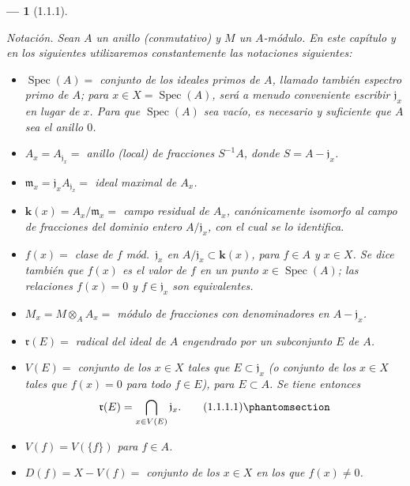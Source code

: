 \documentclass[oneside]{amsart}
\theoremstyle{ega-env-style}
\newtheorem*{env}{---}
\theoremstyle{ega-thm-env-style}
\theoremstyle{ega-defn-env-style}
\newcommand{\oldpage}[2][]{{\marginnote{\normalfont{\textbf{#1}~|~#2}}}\ignorespaces}
\let\EGAOriginalLabel\label
\renewcommand{\label}[1]{\phantomsection\EGAOriginalLabel{#1}}
\begin{document}
\oldpage[I]{80}
\begin{env}[1.1.1]
\label{I.1.1.1}

\emph{Notación}. Sean $A$ un anillo (conmutativo) y $M$ un $A$-módulo.
En este capítulo y en los siguientes utilizaremos constantemente las notaciones siguientes:
\begin{itemize}
  \item $\operatorname{Spec}(A)={}$ \emph{conjunto de los ideales primos} de $A$, llamado también \emph{espectro primo} de $A$; para $x\in X=\operatorname{Spec}(A)$, será a menudo conveniente escribir $\mathfrak{j}_x$ en lugar de $x$.
    Para que $\operatorname{Spec}(A)$ sea \emph{vacío}, es necesario y suficiente que $A$ sea el anillo $0$.
  \item $A_x=A_{\mathfrak{j}_x}={}$ \emph{anillo (local) de fracciones $S^{-1}A$}, donde $S=A-\mathfrak{j}_x$.
  \item $\mathfrak{m}_x=\mathfrak{j}_xA_{\mathfrak{j}_x}={}$ \emph{ideal maximal de $A_x$}.
  \item $\boldsymbol{k}(x)=A_x/\mathfrak{m}_x={}$ \emph{campo residual de $A_x$}, canónicamente isomorfo al campo de fracciones del dominio entero $A/\mathfrak{j}_x$, con el cual se lo identifica.
  \item $f(x)={}$ \emph{clase de $f$ mód.~$\mathfrak{j}_x$} en $A/\mathfrak{j}_x\subset\boldsymbol{k}(x)$, para $f\in A$ y $x\in X$.
    Se dice también que $f(x)$ es el \emph{valor} de $f$ en un punto $x\in\operatorname{Spec}(A)$; las relaciones $f(x)=0$ y $f\in\mathfrak{j}_x$ son \emph{equivalentes}.
  \item $M_x=M\otimes_AA_x={}$ \emph{módulo de fracciones con denominadores en $A-\mathfrak{j}_x$}.
  \item $\mathfrak{r}(E)={}$ \emph{radical del ideal de $A$ engendrado por un subconjunto $E$ de $A$}.
  \item $V(E)={}$ \emph{conjunto de los $x\in X$ tales que $E\subset\mathfrak{j}_x$} (o conjunto de los $x\in X$ tales que $f(x)=0$ para todo $f\in E$), para $E\subset A$.
    Se tiene entonces
    \begin{equation}
  \mathfrak{r}(E)=\bigcap_{x\in V(E)}\mathfrak{j}_x.
  \tag{1.1.1.1}\label{I.1.1.1.1-fr}
\end{equation}
  \item $V(f)=V(\{f\})$ para $f\in A$.
  \item $D(f)=X-V(f)={}$ \emph{conjunto de los $x\in X$ en los que $f(x)\neq0$}.
\end{itemize}
\end{env}
\end{document}
